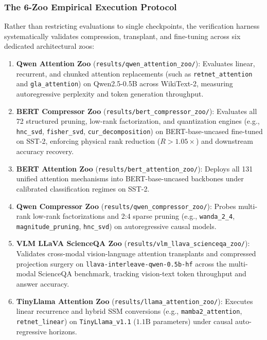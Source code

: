 \subsubsection{The 6-Zoo Empirical Execution Protocol}
\label{sec:setup_6zoo_protocol}
Rather than restricting evaluations to single checkpoints, the \neuralops{} verification harness systematically validates compression, transplant, and fine-tuning across six dedicated architectural zoos:
\begin{enumerate}
    \item \textbf{Qwen Attention Zoo} (\texttt{results/qwen\_attention\_zoo/}): Evaluates linear, recurrent, and chunked attention replacements (such as \texttt{retnet\_attention} and \texttt{gla\_attention}) on Qwen2.5-0.5B across WikiText-2, measuring autoregressive perplexity and token generation throughput.
    \item \textbf{BERT Compressor Zoo} (\texttt{results/bert\_compressor\_zoo/}): Evaluates all 72 structured pruning, low-rank factorization, and quantization engines (e.g., \texttt{hnc\_svd}, \texttt{fisher\_svd}, \texttt{cur\_decomposition}) on BERT-base-uncased fine-tuned on SST-2, enforcing physical rank reduction ($R > 1.05\times$) and downstream accuracy recovery.
    \item \textbf{BERT Attention Zoo} (\texttt{results/bert\_attention\_zoo/}): Deploys all 131 unified attention mechanisms into BERT-base-uncased backbones under calibrated classification regimes on SST-2.
    \item \textbf{Qwen Compressor Zoo} (\texttt{results/qwen\_compressor\_zoo/}): Probes multi-rank low-rank factorizations and 2:4 sparse pruning (e.g., \texttt{wanda\_2\_4}, \texttt{magnitude\_pruning}, \texttt{hnc\_svd}) on autoregressive causal models.
    \item \textbf{VLM LLaVA ScienceQA Zoo} (\texttt{results/vlm\_llava\_scienceqa\_zoo/}): Validates cross-modal vision-language attention transplants and compressed projection surgery on \texttt{llava-interleave-qwen-0.5b-hf} across the multi-modal ScienceQA benchmark, tracking vision-text token throughput and answer accuracy.
    \item \textbf{TinyLlama Attention Zoo} (\texttt{results/llama\_attention\_zoo/}): Executes linear recurrence and hybrid SSM conversions (e.g., \texttt{mamba2\_attention}, \texttt{retnet\_linear}) on \texttt{TinyLlama\_v1.1} ($1.1\text{B}$ parameters) under causal auto-regressive horizons.
\end{enumerate}

